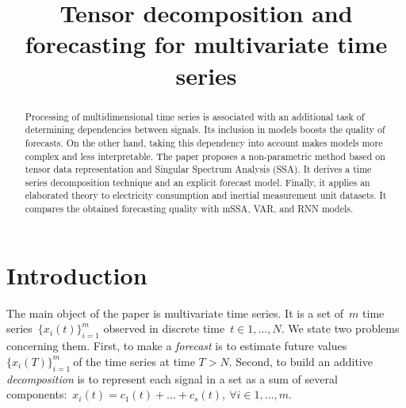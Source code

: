 \documentclass[referee, pdflatex, sn-mathphys-num]{sn-jnl}
\theoremstyle{definition}
\theoremstyle{plain}
\begin{document}
	
	\title{Tensor decomposition and forecasting for multivariate time series}
	
	\author*[1]{ }
	\author*[2]{ }
	
	
	
	\maketitle
	
	\begin{abstract}
		
		Processing of multidimensional time series is associated with an additional task of determining dependencies between signals. Its inclusion in models boosts the quality of forecasts. On the other hand, taking this dependency into account makes models more complex and less interpretable. The paper proposes a non-parametric method based on tensor data representation and Singular Spectrum Analysis (SSA). It derives a time series decomposition technique and an explicit forecast model. Finally, it applies an elaborated theory to electricity consumption and inertial measurement unit datasets. It compares the obtained forecasting quality with mSSA, VAR, and RNN models.
		
	\end{abstract}
	
	\section{Introduction}\label{Intro}
	
	The main object of the paper is multivariate time series. It is a set of~$m $ time series~$\{x_i(t)\}_{i=1}^m $ observed in discrete time~$t \in 1 , \ldots , N $.	We state two problems concerning them. First, to make a \emph{forecast} is to estimate future values $ \{x_i(T)\}_{i=1}^m~$of the time series at time $ T > N $. Second, to build an additive \emph{decomposition} is to represent each signal in a set as a sum of several components:~$x_i(t) = c_1(t) + \ldots + c_s(t), \ \forall i \in 1, \ldots , m $.
\end{document}
